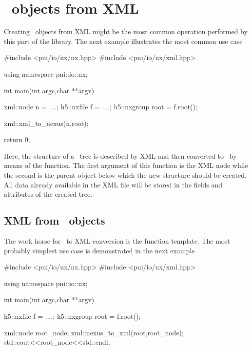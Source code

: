 {%
\section{\nexus\ objects from XML}\label{sec:xml::nxtoxml}

Creating \nexus\ objects from XML might be the most common operation performed 
by this part of the library. The next example illustrates the most common 
use case 
\begin{cppcode}
#include <pni/io/nx/nx.hpp>
#include <pni/io/nx/xml.hpp>

using namespace pni::io::nx;

int main(int argc,char **argv)
{
    xml::node n = ....;
    h5::nxfile f = ....;
    h5::nxgroup root = f.root();
    
    xml::xml_to_nexus(n,root);

    return 0;
}
\end{cppcode}
Here, the structure of a \nexus\ tree is described by XML and then converted 
to \nexus\ by means of the  function. The first argument 
of this function is the XML node while the second is the parent object 
below which the new structure should be created. All data already available 
in the XML file will be stored in the fields and attributes of the created
\nexus\-tree. 


\subsection{XML from \nexus\ objects}\label{sec:xml:xmltonx}

The work horse for \nexus\ to XML conversion is the  function
template. The most probably simplest use case is demonstrated in the next
example 
\begin{cppcode}
#include <pni/io/nx/nx.hpp>
#include <pni/io/nx/xml.hpp>

using namespace pni::io::nx;

int main(int argc,char **argv)
{
    h5::nxfile f = ....;
    h5::nxgroup root = f.root();

    xml::node root_node;
    xml::nexus_to_xml(root,root_node);
    std::cout<<root_node<<std::endl;

}
\end{cppcode}}
